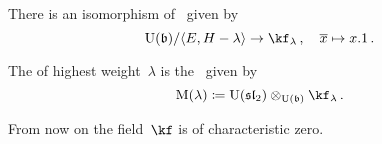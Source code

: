 \documentclass[a4paper, 11pt, oneside]{scrartcl}
\begin{document}
\begin{lemma}
  There is an isomorphism of~\modules{$\Univ(\blie)$} given by
  \[
    \Univ(\blie) / \gen{E, H - \lambda}
    \to
    \kf_\lambda \,,
    \quad
    \class{x}
    \mapsto
    x.1 \,.
  \]
\end{lemma}

\begin{definition}
  The  of highest weight~$\lambda$ is the~ given by
  \[
    \verma(\lambda)
    \defined
    \Univ(\sllie_2) \tensor_{\Univ(\blie)} \kf_\lambda \,.
  \]
\end{definition}

\begin{convention}
  From now on the field~$\kf$ is of characteristic zero.
\end{convention}
\end{document}
